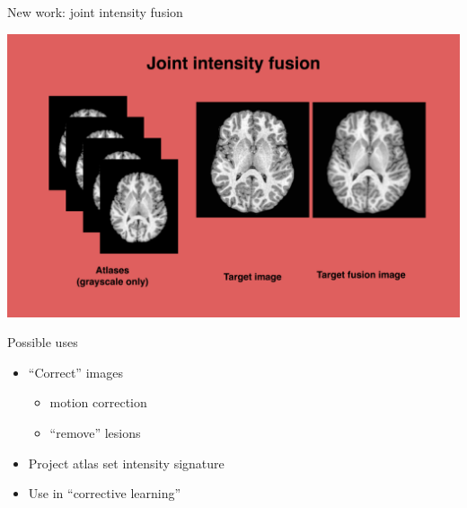 \documentclass[ignorenonframetext,]{beamer}
\begin{document}
\begin{frame}{New work: joint intensity fusion}

\includegraphics{./tools/jointfusion/figures/jointIntensityFusion.png}

\end{frame}

\begin{frame}{Possible uses}

\begin{itemize}
\item
  ``Correct'' images

  \begin{itemize}
  \item
    motion correction
  \item
    ``remove'' lesions
  \end{itemize}
\item
  Project atlas set intensity signature
\item
  Use in ``corrective learning''
\end{itemize}

\end{frame}
\end{document}
